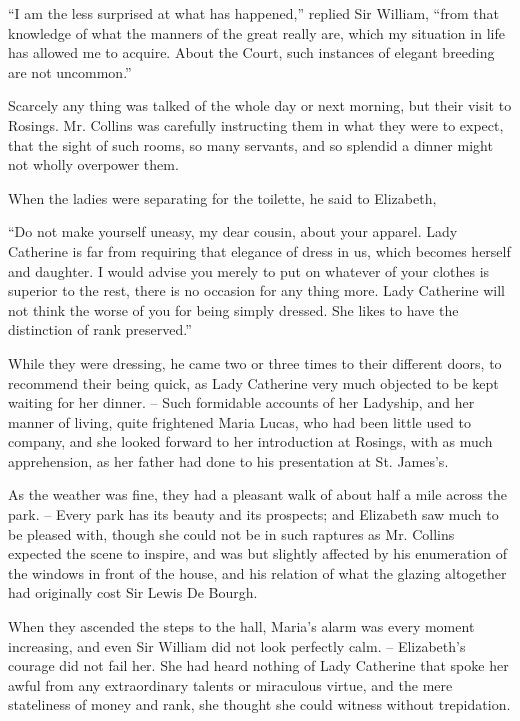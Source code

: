 “I am the less surprised at what has happened,”
replied Sir William, “from that knowledge of what the
manners of the great really are, which my situation in
life has allowed me to acquire. About the Court, such
instances of elegant breeding are not uncommon.”

Scarcely any thing was talked of the whole day or next
morning, but their visit to Rosings. Mr. Collins was
carefully instructing them in what they were to expect,
that the sight of such rooms, so many servants, and so
splendid a dinner might not wholly overpower them.

When the ladies were separating for the toilette, he said
to Elizabeth,

“Do not make yourself uneasy, my dear cousin, about
your apparel. Lady Catherine is far from requiring that
elegance of dress in us, which becomes herself and daughter.
I would advise you merely to put on whatever of your
clothes is superior to the rest, there is no occasion for
any thing more. Lady Catherine will not think the worse
of you for being simply dressed. She likes to have the
distinction of rank preserved.”

While they were dressing, he came two or three times
to their different doors, to recommend their being quick,
as Lady Catherine very much objected to be kept waiting
for her dinner. -- Such formidable accounts of her Ladyship,
and her manner of living, quite frightened Maria Lucas,
who had been little used to company, and she looked
forward to her introduction at Rosings, with as much
apprehension, as her father had done to his presentation
at St. James’s.

As the weather was fine, they had a pleasant walk of
about half a mile across the park. -- Every park has its
beauty and its prospects; and Elizabeth saw much to
be pleased with, though she could not be in such raptures
as Mr. Collins expected the scene to inspire, and was but
slightly affected by his enumeration of the windows in
front of the house, and his relation of what the glazing
altogether had originally cost Sir Lewis De Bourgh.

When they ascended the steps to the hall, Maria’s
alarm was every moment increasing, and even Sir William
did not look perfectly calm. -- Elizabeth’s courage did not
fail her. She had heard nothing of Lady Catherine that
spoke her awful from any extraordinary talents or miraculous
virtue, and the mere stateliness of money and rank,
she thought she could witness without trepidation.

